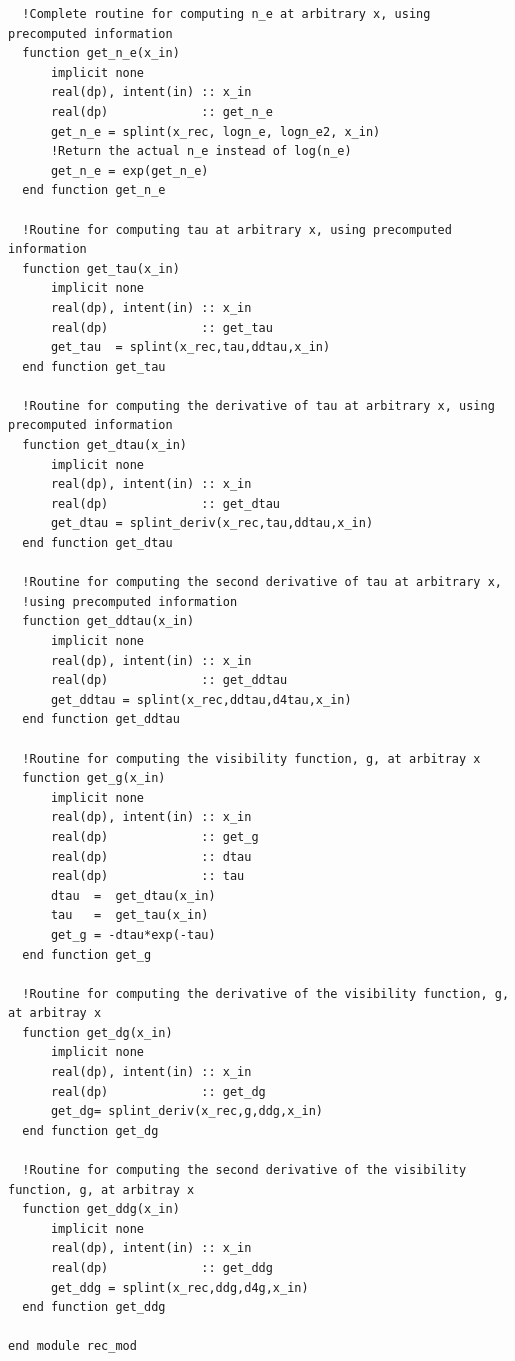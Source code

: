 \documentclass{aa}   %
\begin{document}
\begin{verbatim}
  !Complete routine for computing n_e at arbitrary x, using precomputed information
  function get_n_e(x_in)
      implicit none
      real(dp), intent(in) :: x_in
      real(dp)             :: get_n_e
      get_n_e = splint(x_rec, logn_e, logn_e2, x_in)
      !Return the actual n_e instead of log(n_e)
      get_n_e = exp(get_n_e)
  end function get_n_e

  !Routine for computing tau at arbitrary x, using precomputed information
  function get_tau(x_in)
      implicit none
      real(dp), intent(in) :: x_in
      real(dp)             :: get_tau
      get_tau  = splint(x_rec,tau,ddtau,x_in)
  end function get_tau

  !Routine for computing the derivative of tau at arbitrary x, using precomputed information
  function get_dtau(x_in)
      implicit none
      real(dp), intent(in) :: x_in
      real(dp)             :: get_dtau
      get_dtau = splint_deriv(x_rec,tau,ddtau,x_in)
  end function get_dtau

  !Routine for computing the second derivative of tau at arbitrary x, 
  !using precomputed information
  function get_ddtau(x_in)
      implicit none
      real(dp), intent(in) :: x_in
      real(dp)             :: get_ddtau
      get_ddtau = splint(x_rec,ddtau,d4tau,x_in)
  end function get_ddtau

  !Routine for computing the visibility function, g, at arbitray x
  function get_g(x_in)
      implicit none
      real(dp), intent(in) :: x_in
      real(dp)             :: get_g
      real(dp)             :: dtau
      real(dp)             :: tau
      dtau  =  get_dtau(x_in)
      tau   =  get_tau(x_in)
      get_g = -dtau*exp(-tau)
  end function get_g

  !Routine for computing the derivative of the visibility function, g, at arbitray x
  function get_dg(x_in)
      implicit none
      real(dp), intent(in) :: x_in
      real(dp)             :: get_dg
      get_dg= splint_deriv(x_rec,g,ddg,x_in)
  end function get_dg

  !Routine for computing the second derivative of the visibility function, g, at arbitray x
  function get_ddg(x_in)
      implicit none
      real(dp), intent(in) :: x_in
      real(dp)             :: get_ddg
      get_ddg = splint(x_rec,ddg,d4g,x_in)
  end function get_ddg

end module rec_mod
\end{verbatim}


\end{document}

